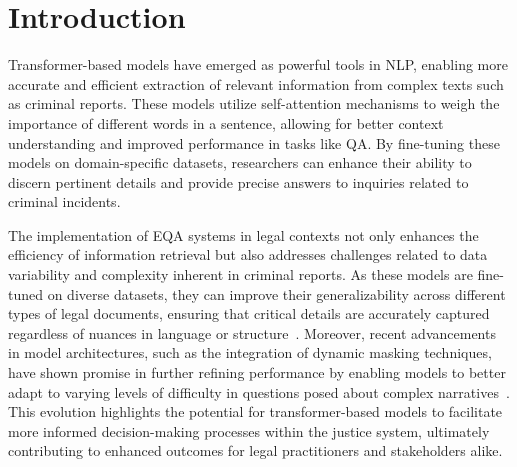 \documentclass[runningheads]{llncs}
\begin{document}
\begin{abstract}


  Transformer-based models have greatly advanced extractive question
  answering (EQA) in NLP, but their application to legal document
  analysis remains underexplored. This paper introduces a
  domain-adapted BERT model for EQA on Spanish-language robbery case
  reports from Ecuador’s Prosecutor's Office (\textit{Fiscalía General
    del Estado}). We used generative artificial intelligence to
  synthesize a SQuAD-format dataset tailored to robbery cases. The
  pre-trained BERT model was first evaluated in a zero-shot setting on
  this dataset, then further fine-tuned for the specific domain. The
  fine-tuned model outperformed the base version, achieving a final
  F1-score of 82.88. Our results demonstrate the effectiveness of
  transformer-based models, both in zero-shot and fine-tuned settings,
  for EQA tasks in legal language processing. These advancements
  highlight the potential to enhance information retrieval and
  optimize workloads in judicial systems, ultimately improving service
  delivery to communities.
  
\end{abstract}
%
%

\section{Introduction}
\label{sec:introduction}

Transformer-based models have emerged as powerful tools in \ac{NLP},
enabling more accurate and efficient extraction of relevant
information from complex texts such as criminal reports. These models
utilize self-attention mechanisms to weigh the importance of different
words in a sentence, allowing for better context understanding and
improved performance in tasks like \ac{QA}. By fine-tuning
these models on domain-specific datasets, researchers can enhance
their ability to discern pertinent details and provide precise answers
to inquiries related to criminal incidents.

The implementation of \ac{EQA} systems in legal contexts not only
enhances the efficiency of information retrieval but also addresses
challenges related to data variability and complexity inherent in
criminal reports. As these models are fine-tuned on diverse datasets,
they can improve their generalizability across different types of
legal documents, ensuring that critical details are accurately
captured regardless of nuances in language or
structure~\cite{jha2022extractive}. Moreover, recent advancements in
model architectures, such as the integration of dynamic masking
techniques, have shown promise in further refining performance by
enabling models to better adapt to varying levels of difficulty in
questions posed about complex
narratives~\cite{Pearce_Zhan_Komanduri_Zhan_2021}. This evolution
highlights the potential for transformer-based models to facilitate
more informed decision-making processes within the justice system,
ultimately contributing to enhanced outcomes for legal practitioners
and stakeholders alike.
\end{document}
